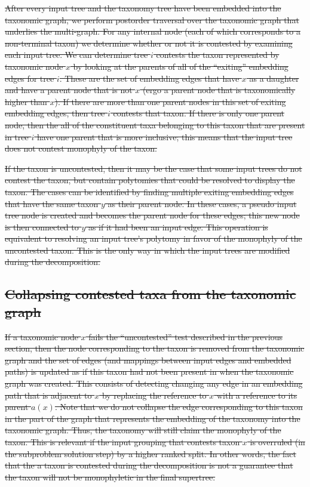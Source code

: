 \documentclass[fleqn,12pt,lineno,english]{wlpeerj}
\providecommand{\DIFdeltex}[1]{{\protect\color{red}\sout{#1}}}                      %
\providecommand{\DIFdel}[1]{\texorpdfstring{\DIFdeltex{#1}}{}} %
\begin{document}
\DIFdel{After every input tree and the taxonomy tree have been embedded into
the taxonomic graph, we perform postorder traversal over the taxonomic
graph that underlies the multi-graph. For any internal node (each
of which corresponds to a non-terminal taxon) we determine whether
or not it is contested by examining each input tree. We can determine
tree $i$ contests the taxon represented by taxonomic node $x$ by
looking at the parents of all of the ``exiting'' embedding edges
for tree $i$. These are the set of embedding edges that have $x$
as a daughter and have a parent node that is not $x$ (ergo a parent
node that is taxonomically higher than $x$). If there are more than
one parent nodes in this set of exiting embedding edges, then tree
$i$ contests that taxon. If there is only one parent node, then the all
of the constituent taxa belonging to this taxon that are present in
tree $i$ have one parent that is more inclusive; this means that
the input tree does not contest monophyly of the taxon.
}%

\DIFdel{If the taxon is uncontested, then it may be the case that some input
trees do not contest the taxon, but contain polytomies that could
be resolved to display the taxon. The cases can be identified by finding
multiple exiting embedding edges that have the same taxon $y$ as
their parent node. In these cases, a pseudo input tree node is created
and becomes the parent node for these edges; this new node is then
connected to $y$ as if it had been an input edge. This operation
is equivalent to resolving an input tree's polytomy in favor of the
monophyly of the uncontested taxon. This is the only way in which
the input trees are modified during the decomposition.
}%

\subsection{\DIFdel{Collapsing contested taxa from the taxonomic graph}}
\addtocounter{subsection}{-1}%

\DIFdel{If a taxonomic node $x$ fails the ``uncontested'' test described
in the previous section, then the node corresponding to the taxon
is removed from the taxonomic graph and the set of edges (and mappings
between input edges and embedded paths) is updated as if this taxon
had not been present in when the taxonomic graph was created. This
consists of detecting changing any edge in an embedding path that
is adjacent to $x$ by replacing the reference to $x$ with a reference
to its parent $a(x)$. Note that we do not collapse the edge corresponding
to this taxon in the part of the graph that represents the embedding
of the taxonomy into the taxonomic graph. Thus, the taxonomy will
still claim the monophyly of the taxon. This is relevant if the input
grouping that contests taxon $x$ is overruled (in the subproblem
solution step) by a higher ranked split. In other words, the fact
that the a taxon is contested during the decomposition is not a guarantee
that the taxon will not be monophyletic in the final supertree.
}%
\end{document}

